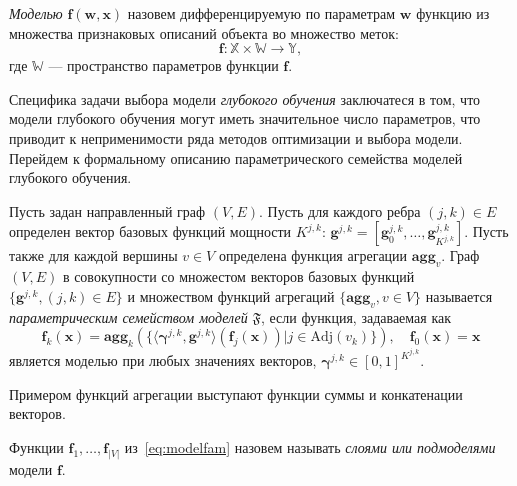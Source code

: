 \begin{defin}
\textit{Моделью} $\mathbf{f}(\mathbf{w}, \mathbf{x})$ назовем дифференцируемую по параметрам $\mathbf{w}$ функцию из множества признаковых описаний объекта во множество меток:
\[
    \mathbf{f}: \mathbb{X} \times \mathbb{W} \to \mathbb{Y},
\] 
где $\mathbb{W}$ --- пространство параметров функции $\mathbf{f}$.
\end{defin}
Специфика задачи  выбора модели \textit{глубокого обучения} заключатеся в том, что модели глубокого обучения могут иметь значительное число параметров, что приводит к неприменимости ряда методов оптимизации и выбора модели. 
Перейдем к формальному описанию параметрического семейства моделей глубокого обучения. 
\begin{defin}
Пусть задан направленный граф $(V,E)$. Пусть для каждого ребра $(j,k) \in E$ определен вектор базовых функций  мощности $K^{j,k}$: $\mathbf{g}^{j,k} = [\mathbf{g}^{j,k}_0, \dots, \mathbf{g}^{j,k}_{K^{j,k}}]$. Пусть также для каждой вершины $v \in V$ определена функция агрегации $\textbf{agg}_v$. Граф $(V, E)$ в совокупности со множестом векторов базовых функций $\{\mathbf{g}^{j,k}, (j,k) \in E\}$ и множеством функций агрегаций $\{ \textbf{agg}_v, {v \in V}\}$ называется \textit{параметрическим семейством моделей} $\mathfrak{F}$, если функция, задаваемая как 
\begin{equation}
\label{eq:modelfam}
    \mathbf{f}_k(\mathbf{x}) = \textbf{agg}_k\left(\{ \langle \boldsymbol{\gamma}^{j,k}, \mathbf{g}^{j,k} \rangle \left(\mathbf{f}_j(\mathbf{x})\right)| j \in \text{Adj}(v_k)\}\right), \quad \mathbf{f}_0(\mathbf{x}) = \mathbf{x}
\end{equation}
является моделью при любых значениях векторов, $\boldsymbol{\gamma}^{j,k} \in [0,1]^{K^{j,k}}$.
\end{defin}
Примером функций агрегации выступают функции суммы и конкатенации векторов.

\begin{defin}
Функции $\mathbf{f}_1, \dots, \mathbf{f}_{|V|}$ из~\eqref{eq:modelfam} назовем называть \textit{слоями или подмоделями} модели $\mathbf{f}$.
\end{defin}


